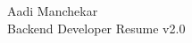 \documentclass{article}
\begin{document}
\begin{center}
    \Huge Aadi Manchekar \\
    \Large Backend Developer Resume v2.0
\end{center}
\end{document}
